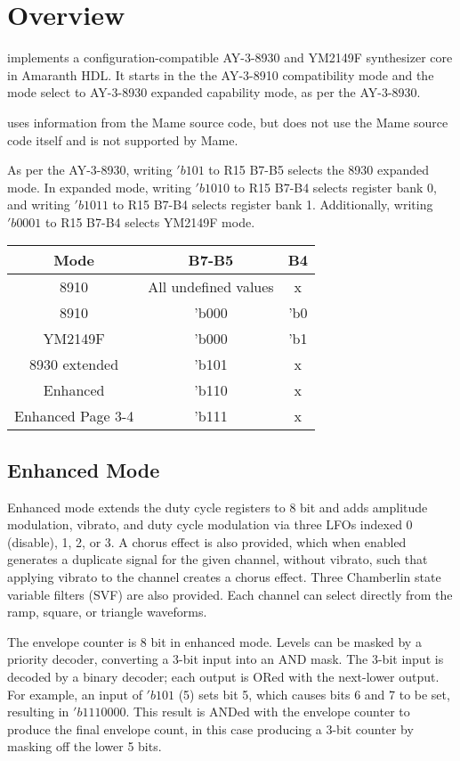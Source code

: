 
\chapter{Overview}

\projectname{ }implements a configuration-compatible AY-3-8930 and YM2149F synthesizer core in Amaranth HDL.  It starts in the the AY-3-8910 compatibility mode and the mode select to AY-3-8930 expanded capability mode, as per the AY-3-8930.

\projectname{ }uses information from the Mame source code, but does not use the Mame source code itself and is not supported by Mame.

As per the AY-3-8930, writing $'b101$ to R15 B7-B5 selects the 8930 expanded mode.  In expanded mode, writing $'b1010$ to R15 B7-B4 selects register bank 0, and writing $'b1011$ to R15 B7-B4 selects register bank 1.  Additionally, writing $'b0001$ to R15 B7-B4 selects YM2149F mode.

\begin{tabular}{|c|c|c|}
    \hline
    Mode & B7-B5 & B4 \\
    \hline
    8910 & All undefined values & x \\
    \hline
    8910 & 'b000 & 'b0 \\
    \hline
    YM2149F & 'b000 & 'b1 \\
    \hline
    8930 extended & 'b101 & x \\
    \hline
    Enhanced & 'b110 & x \\
    \hline
    Enhanced Page 3-4 & 'b111 & x \\
    \hline
\end{tabular}

\section{Enhanced Mode}

Enhanced mode extends the duty cycle registers to 8 bit and adds amplitude modulation, vibrato, and duty cycle modulation via three LFOs indexed 0 (disable), 1, 2, or 3.  A chorus effect is also provided, which when enabled generates a duplicate signal for the given channel, without vibrato, such that applying vibrato to the channel creates a chorus effect.  Three Chamberlin state variable filters (SVF) are also provided.  Each channel can select directly from the ramp, square, or triangle waveforms.

The envelope counter is 8 bit in enhanced mode.  Levels can be masked by a priority decoder, converting a 3-bit input into an AND mask.  The 3-bit input is decoded by a binary decoder; each output is ORed with the next-lower output.  For example, an input of $'b101$ (5) sets bit 5, which causes bits 6 and 7 to be set, resulting in $'b1110000$.  This result is ANDed with the envelope counter to produce the final envelope count, in this case producing a 3-bit counter by masking off the lower 5 bits.

